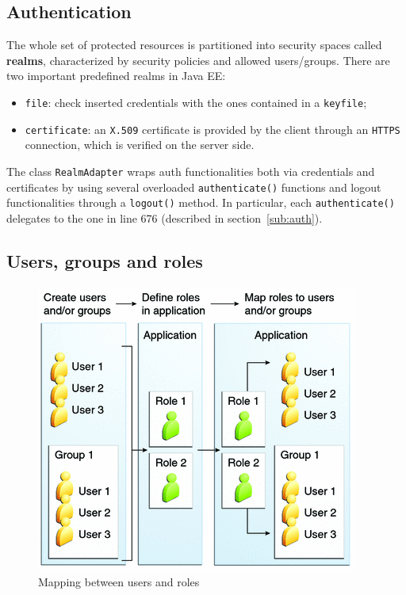 \documentclass[a4paper, 11pt]{article}
\newcommand{\code}[1]{\texttt{#1}}
\begin{document}
\subsection{Authentication}
The whole set of protected resources is partitioned into security spaces called \textbf{realms}, characterized by security policies and allowed users/groups. There are two important predefined realms in Java EE:
\begin{itemize}
    \item \code{file}: check inserted credentials with the ones contained in a \code{keyfile};
    \item \code{certificate}: an \code{X.509} certificate is provided by the client through an \code{HTTPS} connection, which is verified on the server side.
\end{itemize}

The class \code{RealmAdapter} wraps auth functionalities both via credentials and certificates by using several overloaded \code{authenticate()} functions and logout functionalities through a \code{logout()} method. In particular, each \code{authenticate()} delegates to the one in line 676 (described in section~\ref{sub:auth}).

\subsection{Users, groups and roles}
\begin{figure}[tb]
    \centering
    \includegraphics[]{img/security.png}
    \caption{Mapping between users and roles}
    \label{fig:security}
\end{figure}
\end{document}
